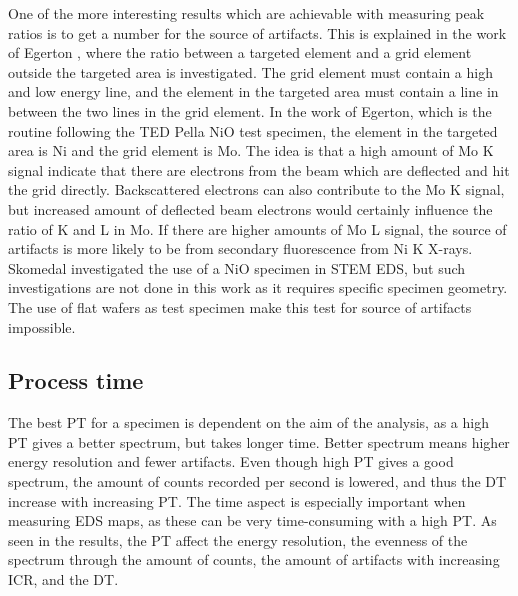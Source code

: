 One of the more interesting results which are achievable with measuring peak ratios is to get a number for the source of artifacts.
This is explained in the work of Egerton \cite{egerton_nio_characterization_1994}, where the ratio between a targeted element and a grid element outside the targeted area is investigated.
The grid element must contain a high and low energy line, and the element in the targeted area must contain a line in between the two lines in the grid element.
In the work of Egerton, which is the routine following the TED Pella NiO test specimen, the element in the targeted area is Ni and the grid element is Mo.
The idea is that a high amount of Mo K signal indicate that there are electrons from the beam which are deflected and hit the grid directly.
Backscattered electrons can also contribute to the Mo K signal, but increased amount of deflected beam electrons would certainly influence the ratio of K and L in Mo.
If there are higher amounts of Mo L signal, the source of artifacts is more likely to be from secondary fluorescence from Ni K X-rays.
Skomedal \cite{skomedal_improving_2022} investigated the use of a NiO specimen in STEM EDS, but such investigations are not done in this work as it requires specific specimen geometry.
The use of flat wafers as test specimen make this test for source of artifacts impossible.









\subsection{Process time}
\label{discussion:process_time}

The best PT for a specimen is dependent on the aim of the analysis, as a high PT gives a better spectrum, but takes longer time.
Better spectrum means higher energy resolution and fewer artifacts.
Even though high PT gives a good spectrum, the amount of counts recorded per second is lowered, and thus the DT increase with increasing PT.
The time aspect is especially important when measuring EDS maps, as these can be very time-consuming with a high PT.
As seen in the results, the PT affect the energy resolution, the evenness of the spectrum through the amount of counts, the amount of artifacts with increasing ICR, and the DT.


